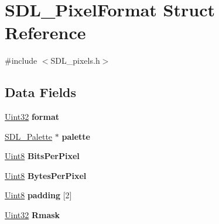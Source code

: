 \hypertarget{struct_s_d_l___pixel_format}{}\section{S\+D\+L\+\_\+\+Pixel\+Format Struct Reference}
\label{struct_s_d_l___pixel_format}


{\ttfamily \#include $<$S\+D\+L\+\_\+pixels.\+h$>$}

\subsection*{Data Fields}
\begin{DoxyCompactItemize}
\item 
\hyperlink{_s_d_l__stdinc_8h_add440eff171ea5f55cb00c4a9ab8672d}{Uint32} {\bfseries format}\hypertarget{struct_s_d_l___pixel_format_a564cec93e3c28ae1ff8340e1079ff385}{}\label{struct_s_d_l___pixel_format_a564cec93e3c28ae1ff8340e1079ff385}

\item 
\hyperlink{struct_s_d_l___palette}{S\+D\+L\+\_\+\+Palette} $\ast$ {\bfseries palette}\hypertarget{struct_s_d_l___pixel_format_a142fe8e3220332fc9b38e59d5b7218a3}{}\label{struct_s_d_l___pixel_format_a142fe8e3220332fc9b38e59d5b7218a3}

\item 
\hyperlink{_s_d_l__stdinc_8h_a2944638813a090aa23e62f4da842c3e2}{Uint8} {\bfseries Bits\+Per\+Pixel}\hypertarget{struct_s_d_l___pixel_format_ae2b4f09d6d3567379f04539cd8ae81f4}{}\label{struct_s_d_l___pixel_format_ae2b4f09d6d3567379f04539cd8ae81f4}

\item 
\hyperlink{_s_d_l__stdinc_8h_a2944638813a090aa23e62f4da842c3e2}{Uint8} {\bfseries Bytes\+Per\+Pixel}\hypertarget{struct_s_d_l___pixel_format_aac593e3f3963d68cd64ca0b58946a121}{}\label{struct_s_d_l___pixel_format_aac593e3f3963d68cd64ca0b58946a121}

\item 
\hyperlink{_s_d_l__stdinc_8h_a2944638813a090aa23e62f4da842c3e2}{Uint8} {\bfseries padding} \mbox{[}2\mbox{]}\hypertarget{struct_s_d_l___pixel_format_a8e55f9ad80f8d4eaddacf7da94dedcb4}{}\label{struct_s_d_l___pixel_format_a8e55f9ad80f8d4eaddacf7da94dedcb4}

\item 
\hyperlink{_s_d_l__stdinc_8h_add440eff171ea5f55cb00c4a9ab8672d}{Uint32} {\bfseries Rmask}\hypertarget{struct_s_d_l___pixel_format_ad72f42bead0db7f2408ae57ea93aa168}{}\label{struct_s_d_l___pixel_format_ad72f42bead0db7f2408ae57ea93aa168}


\end{DoxyCompactItemize}
